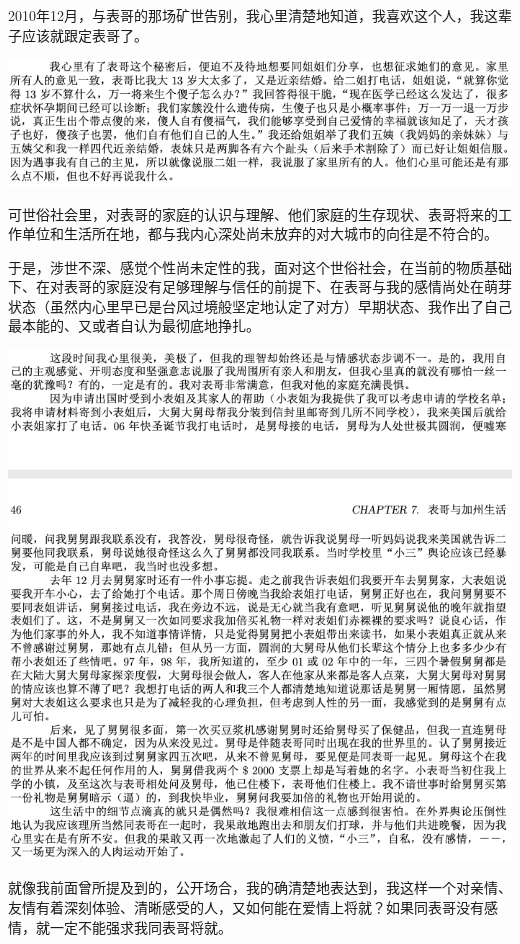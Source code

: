 \documentclass[9pt, b5paper]{article}
\begin{document}
2010年12月，与表哥的那场矿世告别，我心里清楚地知道，我喜欢这个人，我这辈子应该就跟定表哥了。

\begin{center}
\includegraphics[width=.9\linewidth]{./pic/p1p44.png}
\end{center}

可世俗社会里，对表哥的家庭的认识与理解、他们家庭的生存现状、表哥将来的工作单位和生活所在地，都与我内心深处尚未放弃的对大城市的向往是不符合的。

于是，涉世不深、感觉个性尚未定性的我，面对这个世俗社会，在当前的物质基础下、在对表哥的家庭没有足够理解与信任的前提下、在表哥与我的感情尚处在萌芽状态（虽然内心里早已是台风过境般坚定地认定了对方）早期状态、我作出了自己最本能的、又或者自认为最彻底地挣扎。

\begin{center}
\includegraphics[width=.9\linewidth]{./pic/p1p46.png}
\end{center}

就像我前面曾所提及到的，公开场合，我的确清楚地表达到，我这样一个对亲情、友情有着深刻体验、清晰感受的人，又如何能在爱情上将就？如果同表哥没有感情，就一定不能强求我同表哥将就。
\end{document}
